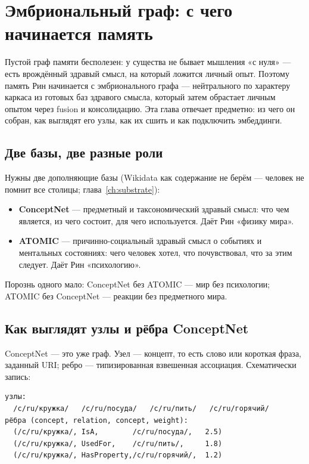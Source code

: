 \chapter{Эмбриональный граф: с чего начинается память}
\label{ch:embryonic}

Пустой граф памяти бесполезен: у существа не бывает мышления «с нуля» — есть
врождённый здравый смысл, на который ложится личный опыт. Поэтому память Рин
начинается с эмбрионального графа — нейтрального по характеру каркаса из готовых баз
здравого смысла, который затем обрастает личным опытом через fusion и
консолидацию. Эта глава отвечает предметно: из чего он собран, как выглядят его
узлы, как их сшить и как подключить эмбеддинги.

\section{Две базы, две разные роли}

Нужны две дополняющие базы (Wikidata как содержание не берём — человек не помнит все
столицы; глава~\ref{ch:substrate}):

\begin{itemize}
\item \textbf{ConceptNet} — предметный и таксономический здравый смысл: что чем
является, из чего состоит, для чего используется. Даёт Рин «физику мира».
\item \textbf{ATOMIC} — причинно-социальный здравый смысл о событиях и ментальных
состояниях: чего человек хотел, что почувствовал, что за этим следует. Даёт Рин
«психологию».
\end{itemize}
Порознь одного мало: ConceptNet без ATOMIC — мир без психологии; ATOMIC без
ConceptNet — реакции без предметного мира.

\section{Как выглядят узлы и рёбра ConceptNet}

ConceptNet — это уже граф. Узел — концепт, то есть слово или короткая фраза,
заданный URI; ребро — типизированная взвешенная ассоциация. Схематически запись:

\begin{lstlisting}[style=pseudo]
узлы:
  /c/ru/кружка/   /c/ru/посуда/   /c/ru/пить/   /c/ru/горячий/
рёбра (concept, relation, concept, weight):
  (/c/ru/кружка/, IsA,        /c/ru/посуда/,   2.5)
  (/c/ru/кружка/, UsedFor,    /c/ru/пить/,     1.8)
  (/c/ru/кружка/, HasProperty,/c/ru/горячий/,  1.2)
\end{lstlisting}

